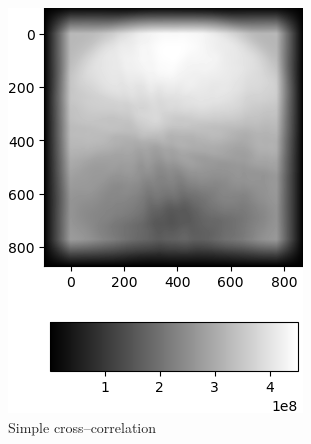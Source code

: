 \begin{figure}
\begin{subfigure}{.49\textwidth}
		\includegraphics[width=\linewidth]{img/normalized_simple_corr}
		\caption{Simple cross--correlation}
		\label{normalized-simple-cross}
	\end{subfigure}
	\begin{subfigure}{.49\textwidth}
		\centering

\end{subfigure}
\end{figure}
